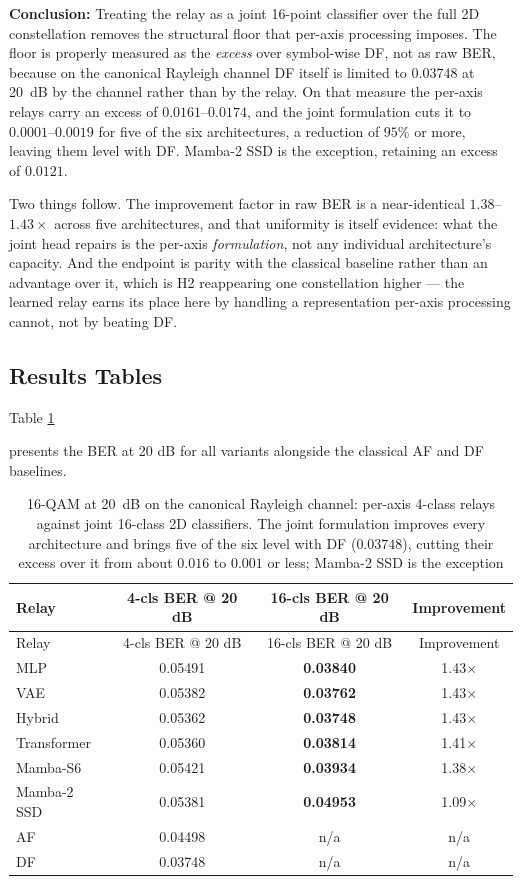 \textbf{Conclusion:} Treating the relay as a joint 16-point classifier over the full 2D constellation removes the structural floor that per-axis processing imposes. The floor is properly measured as the \emph{excess} over symbol-wise DF, not as raw BER, because on the canonical Rayleigh channel DF itself is limited to $0.03748$ at 20~dB by the channel rather than by the relay. On that measure the per-axis relays carry an excess of $0.0161$--$0.0174$, and the joint formulation cuts it to $0.0001$--$0.0019$ for five of the six architectures, a reduction of $95\%$ or more, leaving them level with DF. Mamba-2 SSD is the exception, retaining an excess of $0.0121$.

Two things follow. The improvement factor in raw BER is a near-identical $1.38$--$1.43\times$ across five architectures, and that uniformity is itself evidence: what the joint head repairs is the per-axis \emph{formulation}, not any individual architecture's capacity. And the endpoint is parity with the classical baseline rather than an advantage over it, which is H2 reappearing one constellation higher --- the learned relay earns its place here by handling a representation per-axis processing cannot, not by beating DF.

\subsection{Results Tables}\label{sec:results-tables-5}

Table \ref{tbl:table24}

 presents the BER at 20 dB for all variants alongside the classical AF and DF baselines.

\begin{longtable}[]{@{}lccc@{}}
\caption[16-QAM at 20 dB on the canonical Rayleigh channel]{16-QAM at 20~dB on the canonical Rayleigh channel: per-axis 4-class relays against joint 16-class 2D classifiers. The joint formulation improves every architecture and brings five of the six level with DF ($0.03748$), cutting their excess over it from about $0.016$ to $0.001$ or less; Mamba-2 SSD is the exception}\label{tbl:table24}\tabularnewline
\toprule\noalign{}
Relay & 4-cls BER @ 20 dB & 16-cls BER @ 20 dB & Improvement \\
\midrule\noalign{}
\endfirsthead
\toprule\noalign{}
Relay & 4-cls BER @ 20 dB & 16-cls BER @ 20 dB & Improvement \\
\midrule\noalign{}
\endhead
\bottomrule\noalign{}
\endlastfoot
MLP & 0.05491 & \textbf{0.03840} & 1.43$\times$ \\
VAE & 0.05382 & \textbf{0.03762} & 1.43$\times$ \\
Hybrid & 0.05362 & \textbf{0.03748} & 1.43$\times$ \\
Transformer & 0.05360 & \textbf{0.03814} & 1.41$\times$ \\
Mamba-S6 & 0.05421 & \textbf{0.03934} & 1.38$\times$ \\
Mamba-2 SSD & 0.05381 & \textbf{0.04953} & 1.09$\times$ \\
AF & 0.04498 & n/a & n/a \\
DF & 0.03748 & n/a & n/a \\
\end{longtable}

